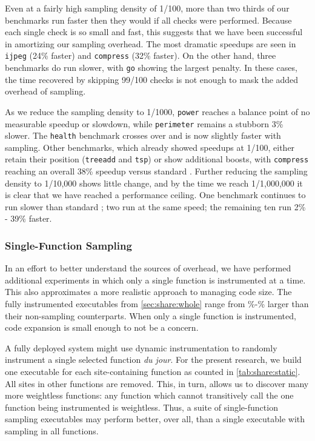 Even at a fairly high sampling density of 1/100, more than two thirds
of our benchmarks run faster then they would if all checks were
performed.  Because each single check is so small and fast, this
suggests that we have been successful in amortizing our sampling
overhead.  The most dramatic speedups are seen in \texttt{ijpeg} (24\%
faster) and \texttt{compress} (32\% faster).  On the other hand, three
benchmarks do run slower, with \texttt{go} showing the largest
penalty.  In these cases, the time recovered by skipping 99/100 checks
is not enough to mask the added overhead of sampling.

As we reduce the sampling density to 1/1000, \texttt{power} reaches a
balance point of no measurable speedup or slowdown, while
\texttt{perimeter} remains a stubborn 3\% slower.  The \texttt{health}
benchmark crosses over and is now slightly faster with sampling.
Other benchmarks, which already showed speedups at 1/100, either
retain their position (\texttt{treeadd} and \texttt{tsp}) or show
additional boosts, with \texttt{compress} reaching an overall 38\%
speedup versus standard \CCured.  Further reducing the sampling
density to 1/10,000 shows little change, and by the time we reach
1/1,000,000 it is clear that we have reached a performance ceiling.
One benchmark continues to run slower than standard \CCured; two run
at the same speed; the remaining ten run 2\% - 39\% faster.

\subsubsection{Single-Function Sampling}


In an effort to better understand the sources of overhead, we have
performed additional experiments in which only a single function is
instrumented at a time.  This also approximates a more realistic
approach to managing code size.  The fully instrumented executables
from \autoref{sec:share:whole} range from
\execGrowthMin\%-\execGrowthMax\% larger than their non-sampling
counterparts.  When only a single function is instrumented, code
expansion is small enough to not be a concern.

A fully deployed system might use dynamic instrumentation to randomly
instrument a single selected function \textit{du jour}.  For the
present research, we build one executable for each site-containing
function as counted in \autoref{tab:share:static}.  All sites in other
functions are removed.  This, in turn, allows us to discover many more
weightless functions: any function which cannot transitively call the
one function being instrumented is weightless.  Thus, a suite of
single-function sampling executables may perform better, over all,
than a single executable with sampling in all functions.

